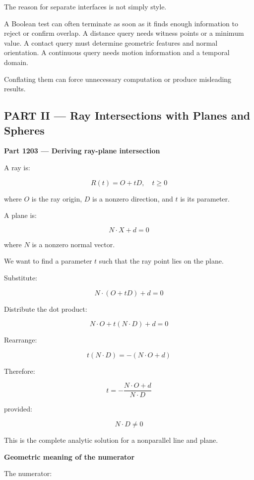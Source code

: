 The reason for separate interfaces is not simply style.

A Boolean test can often terminate as soon as it finds enough information to reject or confirm overlap. A distance query needs witness points or a minimum value. A contact query must determine geometric features and normal orientation. A continuous query needs motion information and a temporal domain.

Conflating them can force unnecessary computation or produce misleading results.

\subsection{PART II --- Ray Intersections with Planes and Spheres}\label{04-visual-computing-ii-ch023-part-ii-ray-intersections-with-planes-and-spheres}

\hypertarget{04-visual-computing-ii-ch023-part-ii-ray-intersections-with-planes-and-spheres}{}

\textbf{Part 1203 --- Deriving ray-plane intersection}

A ray is:

\[
\boxed{R(t)=O+tD,\quad t\ge0}
\]

where \(O\) is the ray origin, \(D\) is a nonzero direction, and \(t\) is its parameter.

A plane is:

\[
\boxed{N\cdot X+d=0}
\]

where \(N\) is a nonzero normal vector.

We want to find a parameter \(t\) such that the ray point lies on the plane.

Substitute:

\[
N\cdot(O+tD)+d=0
\]

Distribute the dot product:

\[
N\cdot O+t(N\cdot D)+d=0
\]

Rearrange:

\[
t(N\cdot D)=-(N\cdot O+d)
\]

Therefore:

\[
\boxed{ t= -\frac{N\cdot O+d}{N\cdot D} }
\]

provided:

\[
N\cdot D\ne0
\]

This is the complete analytic solution for a nonparallel line and plane.

\textbf{Geometric meaning of the numerator}

The numerator:

